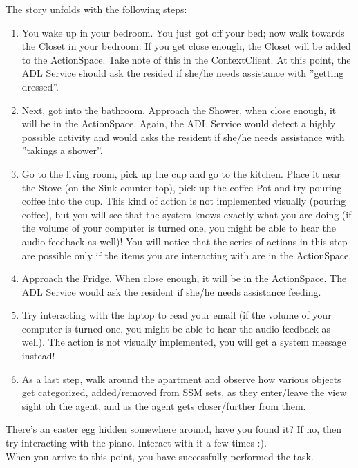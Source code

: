 The story unfolds with the following steps:
\begin{enumerate}
	\item You wake up in your bedroom. You just got off your bed; now walk towards the Closet in your bedroom. If you get close enough, the Closet will be added to the ActionSpace. Take note of this in the ContextClient. At this point, the ADL Service should ask the resided if she/he needs assistance with ''getting dressed''.
	\item Next, got into the bathroom. Approach the Shower, when close enough, it will be in the ActionSpace. Again, the ADL Service would detect a highly possible activity and would asks the resident if she/he needs assistance with ''takings a shower''.
	\item Go to the living room, pick up the cup and go to the kitchen. Place it near the Stove (on the Sink counter-top), pick up the coffee Pot and try pouring coffee into the cup. This kind of action is not implemented visually (pouring coffee), but you will see that the system knows exactly what you are doing (if the volume of your computer is turned one, you might be able to hear the audio feedback as well)! You will notice that the series of actions in this step are possible only if the items you are interacting with are in the ActionSpace.
	\item Approach the Fridge. When close enough, it will be in the ActionSpace. The ADL Service would ask the resident if she/he needs assistance feeding.
	\item Try interacting with the laptop to read your email (if the volume of your computer is turned one, you might be able to hear the audio feedback as well). The action is not visually implemented, you will get a system message instead!
	\item As a last step, walk around the apartment and observe how various objects get categorized, added/removed from SSM sets, as they enter/leave the view sight oh the agent, and as the agent gets closer/further from them.
\end{enumerate}

There's an easter egg hidden somewhere around, have you found it? If no, then try interacting with the piano. Interact with it a few times :).\\

When you arrive to this point, you have successfully performed the task.
